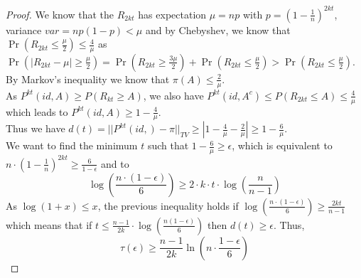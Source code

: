 \documentclass[USenglish,oneside,twocolumn]{article}
\begin{document}
\begin{proof}
We know that the $R_{2kt}$ has expectation $\mu = np$  with $p=\left ( 1 - \frac{1}{n} \right )^{2kt}$, variance $var = np(1-p) <\mu$ and by Chebyshev, we know that $\Pr(R_{2kt}\leq \frac{\mu}{2})\leq \frac{4}{\mu}$
as $\Pr(|R_{2kt} - \mu|\geq \frac{\mu}{2}) = \Pr(R_{2kt} \geq \frac{3\mu}{2}) + \Pr(R_{2kt} \leq \frac{\mu}{2}) > \Pr(R_{2kt} \leq \frac{\mu}{2})$.\\

By Markov's inequality we know that $\pi(A) \leq \frac{2}{\mu}$.\\

As $P^{kt}(id,A) \geq P(R_{kt}\geq A) $, we also have $P^{kt}(id,A^c) \leq P(R_{2kt}\leq A) \leq \frac{4}{\mu} $ which leads to $P^{kt}(id,A)\geq1 - \frac{4}{\mu}$.\\

Thus we have $d(t)=||P^{kt}(id,) - \pi ||_{TV} \geq |1 - \frac{4}{\mu} - \frac{2}{\mu}| \geq 1 - \frac{6}{\mu}$.\\

We want to find the minimum $t$ such that $1-\frac{6}{\mu}\geq \epsilon$, which is equivalent to $n \cdot \left ( 1 - \frac{1}{n} \right )^{2kt} \geq \frac{6}{1-\epsilon}$ and to
$$\log\left(\frac{n\cdot (1-\epsilon)}{6}\right) \geq 2\cdot k\cdot t \cdot \log \left ( \frac{n}{n-1} \right )$$
As $\log(1+x) \leq x$, the previous inequality holds if $\log\left(\frac{n\cdot (1-\epsilon)}{6}\right) \geq   \frac{2kt}{n-1} $ which means that if $t\leq \frac{n-1}{2k}\cdot \log\left ( \frac{n(1-\epsilon)}{6}\right )$ then $d(t)\geq \epsilon$.
Thus,
$$\tau \left (\epsilon \right ) \geq \frac{n-1}{2k} \ln(n\cdot \frac{1-\epsilon}{6}) $$
\end{proof}
\end{document}
